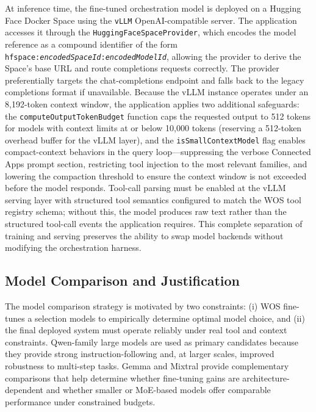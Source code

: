\documentclass[conference]{IEEEtran}
\begin{document}
At inference time, the fine-tuned orchestration model is deployed on a Hugging Face Docker Space using the \texttt{vLLM} OpenAI-compatible server. The application accesses it through the \texttt{HuggingFaceSpaceProvider}, which encodes the model reference as a compound identifier of the form \texttt{hfspace:\textit{encodedSpaceId}:\textit{encodedModelId}}, allowing the provider to derive the Space's base URL and route completions requests correctly. The provider preferentially targets the chat-completions endpoint and falls back to the legacy completions format if unavailable. Because the vLLM instance operates under an 8,192-token context window, the application applies two additional safeguards: the \texttt{computeOutputTokenBudget} function caps the requested output to 512 tokens for models with context limits at or below 10,000 tokens (reserving a 512-token overhead buffer for the vLLM layer), and the \texttt{isSmallContextModel} flag enables compact-context behaviors in the query loop---suppressing the verbose Connected Apps prompt section, restricting tool injection to the most relevant families, and lowering the compaction threshold to ensure the context window is not exceeded before the model responds. Tool-call parsing must be enabled at the vLLM serving layer with structured tool semantics configured to match the WOS tool registry schema; without this, the model produces raw text rather than the structured tool-call events the application requires. This complete separation of training and serving preserves the ability to swap model backends without modifying the orchestration harness.
\subsection{Model Comparison and Justification}
The model comparison strategy is motivated by two constraints: (i) WOS fine-tunes a selection models to empirically determine optimal model choice, and (ii) the final deployed system must operate reliably under real tool and context constraints. Qwen-family large models are used as primary candidates because they provide strong instruction-following and, at larger scales, improved robustness to multi-step tasks. Gemma and Mixtral provide complementary comparisons that help determine whether fine-tuning gains are architecture-dependent and whether smaller or MoE-based models offer comparable performance under constrained budgets.
\end{document}
